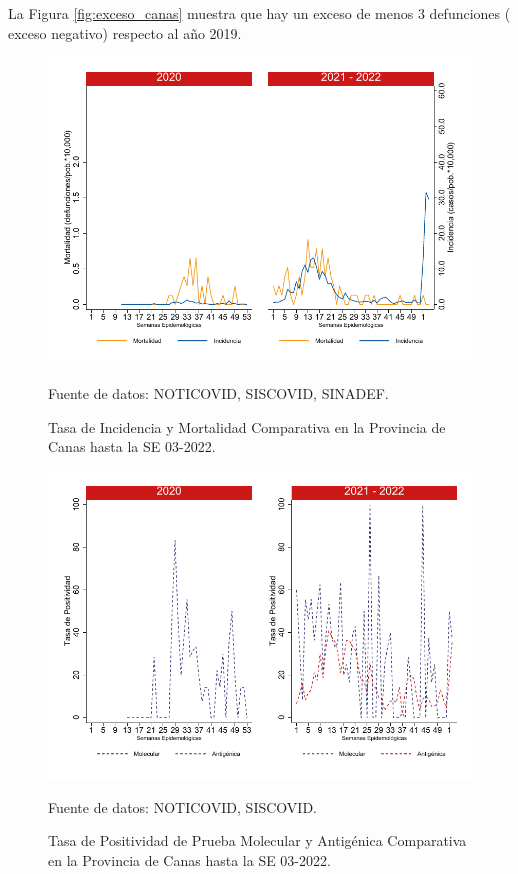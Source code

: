 \documentclass[12pt,a4paper,openany]{book}
\begin{document}
		La Figura \ref{fig:exceso_canas} muestra que hay un exceso de menos 3 defunciones ( exceso negativo) respecto al año 2019.
		
		\begin{figure}[h]
			\caption{Tasa de Incidencia y Mortalidad Comparativa en la Provincia de Canas hasta la SE 03-2022.}\label{fig:inc_mort_canas}
			\begin{center}
				\includegraphics[width=0.7\linewidth]{../figuras/incidencia_mortalidad_20_21_3}
			\end{center}
			{\footnotesize {Fuente de datos: NOTICOVID, SISCOVID, SINADEF.}}
		\end{figure}
		
		\begin{figure}[h]
			\caption{Tasa de Positividad de Prueba Molecular y Antigénica Comparativa en la Provincia de Canas hasta la SE 03-2022.}\label{fig:positividad_canas}
			\begin{center}
				\includegraphics[width=0.7\linewidth]{../figuras/positividad_20_21_3}
			\end{center}
			{\footnotesize {Fuente de datos: NOTICOVID, SISCOVID.}}
		\end{figure}
		
\end{document}
